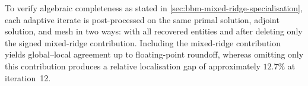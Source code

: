 To verify algebraic completeness as stated in \cref{sec:bbm-mixed-ridge-specialisation}, each adaptive iterate is post-processed on the same primal solution, adjoint solution, and mesh in two ways: with all recovered entities and after deleting only the signed mixed-ridge contribution.
Including the mixed-ridge contribution yields global--local agreement up to floating-point roundoff, whereas omitting only this contribution produces a relative localisation gap of approximately \(12.7\%\) at iteration~12.



